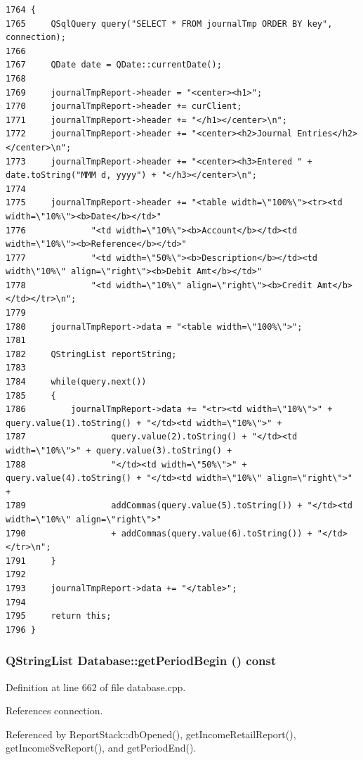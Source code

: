 \footnotesize\begin{verbatim}1764 {
1765     QSqlQuery query("SELECT * FROM journalTmp ORDER BY key", connection);
1766     
1767     QDate date = QDate::currentDate();
1768 
1769     journalTmpReport->header = "<center><h1>";
1770     journalTmpReport->header += curClient;
1771     journalTmpReport->header += "</h1></center>\n";
1772     journalTmpReport->header += "<center><h2>Journal Entries</h2></center>\n";
1773     journalTmpReport->header += "<center><h3>Entered " + date.toString("MMM d, yyyy") + "</h3></center>\n";
1774 
1775     journalTmpReport->header += "<table width=\"100%\"><tr><td width=\"10%\"><b>Date</b></td>"
1776             "<td width=\"10%\"><b>Account</b></td><td width=\"10%\"><b>Reference</b></td>"
1777             "<td width=\"50%\"><b>Description</b></td><td width\"10%\" align=\"right\"><b>Debit Amt</b></td>"
1778             "<td width=\"10%\" align=\"right\"><b>Credit Amt</b></td></tr>\n";
1779 
1780     journalTmpReport->data = "<table width=\"100%\">";
1781     
1782     QStringList reportString;
1783     
1784     while(query.next())
1785     {
1786         journalTmpReport->data += "<tr><td width=\"10%\">" + query.value(1).toString() + "</td><td width=\"10%\">" +
1787                 query.value(2).toString() + "</td><td width=\"10%\">" + query.value(3).toString() +
1788                 "</td><td width=\"50%\">" + query.value(4).toString() + "</td><td width=\"10%\" align=\"right\">" +
1789                 addCommas(query.value(5).toString()) + "</td><td width=\"10%\" align=\"right\">"
1790                 + addCommas(query.value(6).toString()) + "</td></tr>\n";
1791     }
1792 
1793     journalTmpReport->data += "</table>";
1794     
1795     return this;
1796 }
\end{verbatim}\normalsize 


\hypertarget{classDatabase_a16}{
\subsubsection[getPeriodBegin]{\setlength{\rightskip}{0pt plus 5cm}QString\-List Database::get\-Period\-Begin () const}}
\label{classDatabase_a16}


Definition at line 662 of file database.cpp.

References connection.

Referenced by Report\-Stack::db\-Opened(), get\-Income\-Retail\-Report(), get\-Income\-Svc\-Report(), and get\-Period\-End().

